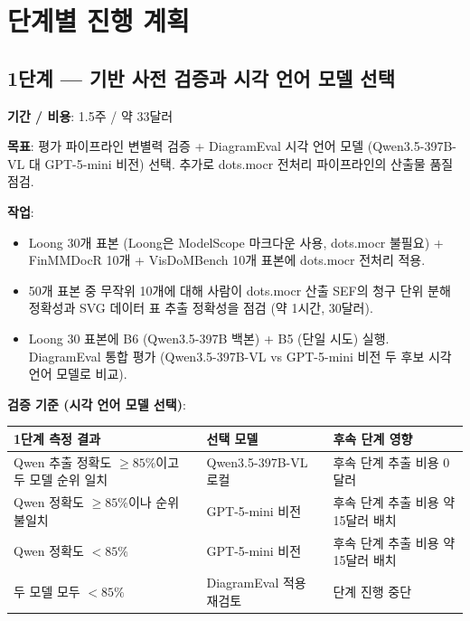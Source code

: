 \documentclass[11pt]{article}
\begin{document}
\section{단계별 진행 계획}

\subsection{1단계 — 기반 사전 검증과 시각 언어 모델 선택}

\textbf{기간 / 비용}: 1.5주 / 약 33달러

\textbf{목표}: 평가 파이프라인 변별력 검증 + DiagramEval 시각 언어 모델 (Qwen3.5-397B-VL 대 GPT-5-mini 비전) 선택. 추가로 dots.mocr 전처리 파이프라인의 산출물 품질 점검.

\textbf{작업}:
\begin{itemize}[leftmargin=*]
    \item Loong 30개 표본 (Loong은 ModelScope 마크다운 사용, dots.mocr 불필요) + FinMMDocR 10개 + VisDoMBench 10개 표본에 dots.mocr 전처리 적용.
    \item 50개 표본 중 무작위 10개에 대해 사람이 dots.mocr 산출 SEF의 청구 단위 분해 정확성과 SVG 데이터 표 추출 정확성을 점검 (약 1시간, 30달러).
    \item Loong 30 표본에 B6 (Qwen3.5-397B 백본) + B5 (단일 시도) 실행. DiagramEval 통합 평가 (Qwen3.5-397B-VL vs GPT-5-mini 비전 두 후보 시각 언어 모델로 비교).
\end{itemize}

\textbf{검증 기준 (시각 언어 모델 선택)}:

\begin{table}[h]
\centering
\small
\begin{tabular}{lp{6.5cm}l}
\toprule
1단계 측정 결과 & 선택 모델 & 후속 단계 영향 \\
\midrule
Qwen 추출 정확도 $\geq 85\%$이고 두 모델 순위 일치 & Qwen3.5-397B-VL 로컬 & 후속 단계 추출 비용 0달러 \\
Qwen 정확도 $\geq 85\%$이나 순위 불일치 & GPT-5-mini 비전 & 후속 단계 추출 비용 약 15달러 배치 \\
Qwen 정확도 $< 85\%$ & GPT-5-mini 비전 & 후속 단계 추출 비용 약 15달러 배치 \\
두 모델 모두 $< 85\%$ & DiagramEval 적용 재검토 & 단계 진행 중단 \\
\bottomrule
\end{tabular}
\end{table}
\end{document}
